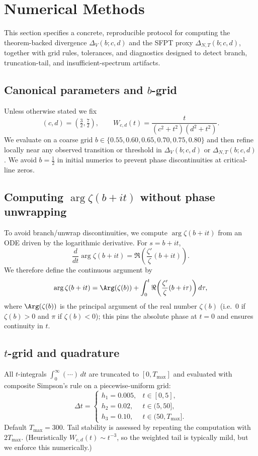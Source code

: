 \documentclass[11pt]{article}
\theoremstyle{definition}
\begin{document}
\section{Numerical Methods}\label{sec:numerical}

This section specifies a concrete, reproducible protocol for computing the theorem-backed divergence
\(\Delta_V(b;c,d)\) and the SFPT proxy \(\Delta_{N,T}(b;c,d)\), together with grid rules, tolerances,
and diagnostics designed to detect branch, truncation-tail, and insufficient-spectrum artifacts.

\subsection{Canonical parameters and \(b\)-grid}\label{subsec:params}
Unless otherwise stated we fix
\[
(c,d)=\left(\tfrac32,\tfrac72\right),
\qquad
W_{c,d}(t)=\frac{t}{(c^2+t^2)(d^2+t^2)}.
\]
We evaluate on a coarse grid \(b\in\{0.55,0.60,0.65,0.70,0.75,0.80\}\) and then refine locally near any
observed transition or threshold in \(\Delta_V(b;c,d)\) or \(\Delta_{N,T}(b;c,d)\).
We avoid \(b=\tfrac12\) in initial numerics to prevent phase discontinuities at critical-line zeros.

\subsection{Computing \(\arg\zeta(b+it)\) without phase unwrapping}\label{subsec:arg}
To avoid branch/unwrap discontinuities, we compute \(\arg\zeta(b+it)\) from an ODE driven by the
logarithmic derivative. For \(s=b+it\),
\begin{equation}\label{eq:dargdt}
\frac{d}{dt}\arg\zeta(b+it)=\Re\!\left(\frac{\zeta'}{\zeta}(b+it)\right).
\end{equation}
We therefore define the continuous argument by
\begin{equation}\label{eq:arg_from_logderiv}
\arg\zeta(b+it)=\Arg(\zeta(b))+\int_{0}^{t}\Re\!\left(\frac{\zeta'}{\zeta}(b+i\tau)\right)d\tau,
\end{equation}
where \(\Arg(\zeta(b))\) is the principal argument of the real number \(\zeta(b)\) (i.e.\ \(0\) if
\(\zeta(b)>0\) and \(\pi\) if \(\zeta(b)<0\)); this pins the absolute phase at \(t=0\) and ensures
continuity in \(t\).

\subsection{\(t\)-grid and quadrature}\label{subsec:grid}
All \(t\)-integrals \(\int_0^\infty (\cdots)\,dt\) are truncated to \([0,T_{\max}]\) and evaluated with
composite Simpson's rule on a piecewise-uniform grid:
\[
\Delta t=
\begin{cases}
h_1=0.005, & t\in[0,5],\\
h_2=0.02, & t\in(5,50],\\
h_3=0.10, & t\in(50,T_{\max}].
\end{cases}
\]
Default \(T_{\max}=300\). Tail stability is assessed by repeating the computation with \(2T_{\max}\).
(Heuristically \(W_{c,d}(t)\sim t^{-3}\), so the weighted tail is typically mild, but we enforce this
numerically.)
\end{document}
